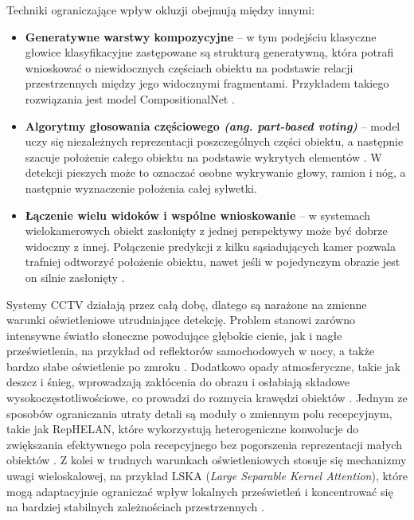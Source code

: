 Techniki ograniczające wpływ okluzji obejmują między innymi:
\begin{itemize}
  \item \textbf{Generatywne warstwy kompozycyjne} – w tym podejściu klasyczne głowice klasyfikacyjne zastępowane są strukturą generatywną, która potrafi wnioskować o niewidocznych częściach obiektu na podstawie relacji przestrzennych między jego widocznymi fragmentami. Przykładem takiego rozwiązania jest model CompositionalNet \cite{cheng2026}.
  \item \textbf{Algorytmy głosowania częściowego \textit{(ang. part-based voting)}} – model uczy się niezależnych reprezentacji poszczególnych części obiektu, a następnie szacuje położenie całego obiektu na podstawie wykrytych elementów \cite{cheng2026}. W detekcji pieszych może to oznaczać osobne wykrywanie głowy, ramion i nóg, a następnie wyznaczenie położenia całej sylwetki.
  \item \textbf{Łączenie wielu widoków i wspólne wnioskowanie} – w systemach wielokamerowych obiekt zasłonięty z jednej perspektywy może być dobrze widoczny z innej. Połączenie predykcji z kilku sąsiadujących kamer pozwala trafniej odtworzyć położenie obiektu, nawet jeśli w pojedynczym obrazie jest on silnie zasłonięty \cite{cheng2026}.
\end{itemize}

Systemy CCTV działają przez całą dobę, dlatego są narażone na zmienne warunki oświetleniowe
utrudniające detekcję. Problem stanowi zarówno intensywne światło słoneczne powodujące głębokie
cienie, jak i nagłe prześwietlenia, na przykład od reflektorów samochodowych w nocy, a także bardzo
słabe oświetlenie po zmroku \cite{nikouei2025}. Dodatkowo opady atmosferyczne, takie jak deszcz i
śnieg, wprowadzają zakłócenia do obrazu i osłabiają składowe wysokoczęstotliwościowe, co prowadzi
do rozmycia krawędzi obiektów \cite{wille2026}. Jednym ze sposobów ograniczania utraty detali są
moduły o zmiennym polu recepcyjnym, takie jak RepHELAN, które wykorzystują heterogeniczne
konwolucje do zwiększania efektywnego pola recepcyjnego bez pogorszenia reprezentacji małych
obiektów \cite{yang2024}. Z kolei w trudnych warunkach oświetleniowych stosuje się mechanizmy uwagi
wieloskalowej, na przykład LSKA (\textit{Large Separable Kernel Attention}), które mogą
adaptacyjnie ograniczać wpływ lokalnych prześwietleń i koncentrować się na bardziej stabilnych
zależnościach przestrzennych \cite{tang2026}.

